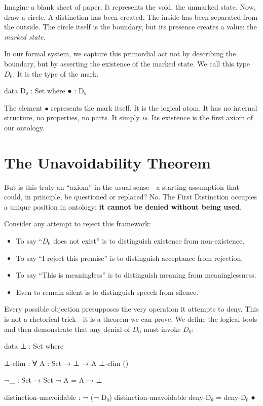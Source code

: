 \documentclass[11pt,a4paper]{book}
\begin{document}
Imagine a blank sheet of paper. It represents the void, the unmarked state. 
Now, draw a circle. A distinction has been created. The inside has been separated from 
the outside. The circle itself is the boundary, but its presence 
creates a value: the \emph{marked state}.

In our formal system, we capture this primordial act not by describing the 
boundary, but by asserting the existence of the marked state. We call this 
type $D_0$. It is the type of the mark.

\begin{code}
data D₀ : Set where
  ● : D₀
\end{code}

The element $\bullet$ represents the mark itself. It is the logical atom. 
It has no internal structure, no properties, no parts. It simply \emph{is}. 
Its existence is the first axiom of our ontology.

\section{The Unavoidability Theorem}

But is this truly an ``axiom'' in the usual sense---a starting assumption that 
could, in principle, be questioned or replaced? No. The First Distinction 
occupies a unique position in ontology: \textbf{it cannot be denied without 
being used}.

Consider any attempt to reject this framework:
\begin{itemize}
\item To say ``$D_0$ does not exist'' is to distinguish existence from non-existence.
\item To say ``I reject this premise'' is to distinguish acceptance from rejection.
\item To say ``This is meaningless'' is to distinguish meaning from meaninglessness.
\item Even to remain silent is to distinguish speech from silence.
\end{itemize}

Every possible objection presupposes the very operation it attempts to deny. 
This is not a rhetorical trick---it is a theorem we can prove. We define the 
logical tools and then demonstrate that any denial of $D_0$ must invoke $D_0$:

\begin{code}
data ⊥ : Set where

⊥-elim : ∀ {A : Set} → ⊥ → A
⊥-elim ()

¬_ : Set → Set
¬ A = A → ⊥

distinction-unavoidable : ¬ (¬ D₀)
distinction-unavoidable deny-D₀ = deny-D₀ ●
\end{code}
\end{document}

